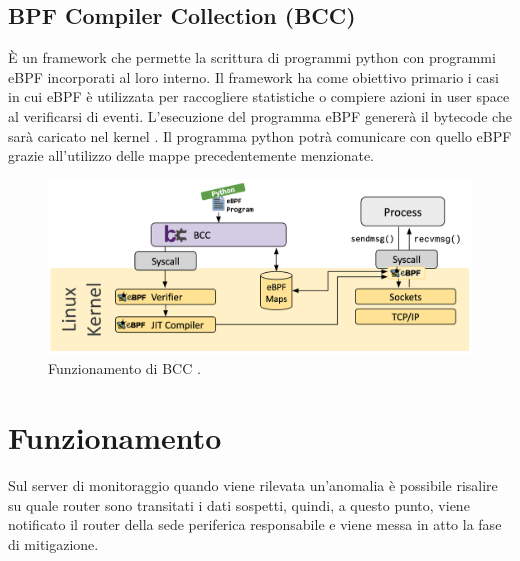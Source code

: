 \subsection{BPF Compiler Collection (BCC)}
 
È un framework che permette la scrittura di programmi python con programmi eBPF incorporati al loro interno. Il framework ha come obiettivo primario i casi in cui eBPF è utilizzata per raccogliere statistiche o compiere azioni in user space al verificarsi di eventi. L'esecuzione del programma eBPF genererà il bytecode che sarà caricato nel kernel \cite{ebpf.io}.
Il programma python potrà comunicare con quello eBPF grazie all'utilizzo delle mappe precedentemente menzionate.

\begin{figure}[]
    \label{fig:bcc}
    \includegraphics[width=\hsize]{images/mitigazione/bcc.png}
    \caption{Funzionamento di BCC \cite{ebpf.io}.}
    \centering
\end{figure}

\section{Funzionamento}





Sul server di monitoraggio quando viene rilevata un'anomalia è possibile risalire su quale router sono transitati i dati sospetti, quindi, a questo punto, viene notificato il router della sede periferica responsabile e viene messa in atto la fase di mitigazione.

